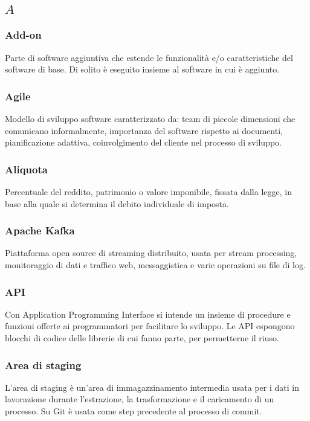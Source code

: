 \subsection*{\quad$A\quad$}
\subsubsection*{Add-on}
Parte di software aggiuntiva che estende le funzionalità e/o caratteristiche del software di base. Di solito è eseguito insieme al software in cui è aggiunto.

\subsubsection*{Agile}
Modello di sviluppo software caratterizzato da: team di piccole dimensioni che comunicano informalmente, importanza del software rispetto ai documenti, pianificazione adattiva, coinvolgimento del cliente nel processo di sviluppo.

\subsubsection*{Aliquota}
Percentuale del reddito, patrimonio o valore imponibile, fissata dalla legge, in base alla quale si determina il debito individuale di imposta.

\subsubsection*{Apache Kafka}
Piattaforma open source di streaming distribuito, usata per stream processing, monitoraggio di dati e traffico web, messaggistica e varie operazioni su file di log.

\subsubsection*{API}
Con Application Programming Interface si intende un insieme di procedure e funzioni offerte ai programmatori per facilitare lo sviluppo. Le API espongono blocchi di codice delle librerie di cui fanno parte, per permetterne il riuso.

\subsubsection*{Area di staging}
L'area di staging è un'area di immagazzinamento intermedia usata per i dati in lavorazione durante l'estrazione, la trasformazione e il caricamento di un processo. Su Git è usata come step precedente al processo di commit.

